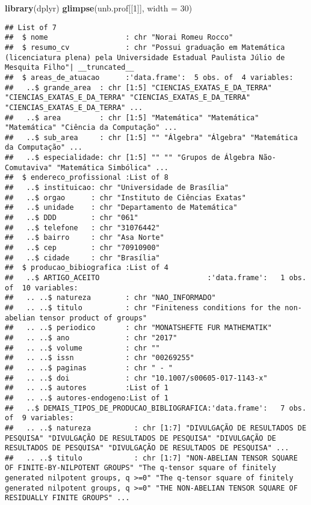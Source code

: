 \documentclass[]{article}
\newenvironment{Shaded}{\begin{snugshade}}{\end{snugshade}}
\newcommand{\KeywordTok}[1]{\textcolor[rgb]{0.13,0.29,0.53}{\textbf{#1}}}
\newcommand{\DataTypeTok}[1]{\textcolor[rgb]{0.13,0.29,0.53}{#1}}
\newcommand{\DecValTok}[1]{\textcolor[rgb]{0.00,0.00,0.81}{#1}}
\newcommand{\NormalTok}[1]{#1}
\begin{document}
\begin{Shaded}
\begin{Highlighting}[]
\KeywordTok{library}\NormalTok{(dplyr) }
\KeywordTok{glimpse}\NormalTok{(unb.prof[[}\DecValTok{1}\NormalTok{]], }\DataTypeTok{width =} \DecValTok{30}\NormalTok{)}
\end{Highlighting}
\end{Shaded}

\begin{verbatim}
## List of 7
##  $ nome                  : chr "Norai Romeu Rocco"
##  $ resumo_cv             : chr "Possui graduação em Matemática (licenciatura plena) pela Universidade Estadual Paulista Júlio de Mesquita Filho"| __truncated__
##  $ areas_de_atuacao      :'data.frame':  5 obs. of  4 variables:
##   ..$ grande_area  : chr [1:5] "CIENCIAS_EXATAS_E_DA_TERRA" "CIENCIAS_EXATAS_E_DA_TERRA" "CIENCIAS_EXATAS_E_DA_TERRA" "CIENCIAS_EXATAS_E_DA_TERRA" ...
##   ..$ area         : chr [1:5] "Matemática" "Matemática" "Matemática" "Ciência da Computação" ...
##   ..$ sub_area     : chr [1:5] "" "Álgebra" "Álgebra" "Matemática da Computação" ...
##   ..$ especialidade: chr [1:5] "" "" "Grupos de Álgebra Não-Comutaviva" "Matemática Simbólica" ...
##  $ endereco_profissional :List of 8
##   ..$ instituicao: chr "Universidade de Brasília"
##   ..$ orgao      : chr "Instituto de Ciências Exatas"
##   ..$ unidade    : chr "Departamento de Matemática"
##   ..$ DDD        : chr "061"
##   ..$ telefone   : chr "31076442"
##   ..$ bairro     : chr "Asa Norte"
##   ..$ cep        : chr "70910900"
##   ..$ cidade     : chr "Brasília"
##  $ producao_bibiografica :List of 4
##   ..$ ARTIGO_ACEITO                         :'data.frame':   1 obs. of  10 variables:
##   .. ..$ natureza        : chr "NAO_INFORMADO"
##   .. ..$ titulo          : chr "Finiteness conditions for the non-abelian tensor product of groups"
##   .. ..$ periodico       : chr "MONATSHEFTE FUR MATHEMATIK"
##   .. ..$ ano             : chr "2017"
##   .. ..$ volume          : chr ""
##   .. ..$ issn            : chr "00269255"
##   .. ..$ paginas         : chr " - "
##   .. ..$ doi             : chr "10.1007/s00605-017-1143-x"
##   .. ..$ autores         :List of 1
##   .. ..$ autores-endogeno:List of 1
##   ..$ DEMAIS_TIPOS_DE_PRODUCAO_BIBLIOGRAFICA:'data.frame':   7 obs. of  9 variables:
##   .. ..$ natureza          : chr [1:7] "DIVULGAÇÃO DE RESULTADOS DE PESQUISA" "DIVULGAÇÃO DE RESULTADOS DE PESQUISA" "DIVULGAÇÃO DE RESULTADOS DE PESQUISA" "DIVULGAÇÃO DE RESULTADOS DE PESQUISA" ...
##   .. ..$ titulo            : chr [1:7] "NON-ABELIAN TENSOR SQUARE OF FINITE-BY-NILPOTENT GROUPS" "The q-tensor square of finitely generated nilpotent groups, q >=0" "The q-tensor square of finitely generated nilpotent groups, q >=0" "THE NON-ABELIAN TENSOR SQUARE OF RESIDUALLY FINITE GROUPS" ...

\end{verbatim}
\end{document}
